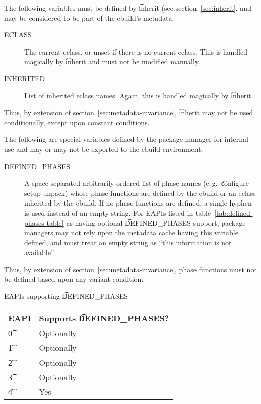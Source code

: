 The following variables must be defined by \t{inherit} (see section~\ref{sec:inherit}, and may be
considered to be part of the ebuild's metadata:

\begin{description}
\item[ECLASS] The current eclass, or unset if there is no current eclass. This is handled magically
    by \t{inherit} and must not be modified manually.
\item[INHERITED] List of inherited eclass names. Again, this is handled magically by \t{inherit}.
\end{description}

\note Thus, by extension of section~\ref{sec:metadata-invariance}, \t{inherit} may not be used
    conditionally, except upon constant conditions.

The following are special variables defined by the package manager for internal use and may or may
not be exported to the ebuild environment:

\begin{description}
\item[DEFINED\_PHASES]  A space separated arbitrarily ordered list of
phase names (e.\,g.\ \t{configure setup unpack}) whose phase functions are defined by the ebuild or
an eclass inherited by the ebuild. If no phase functions are defined, a single hyphen is used
instead of an empty string. For EAPIs listed in table~\ref{tab:defined-phases-table} as having
optional \t{DEFINED\_PHASES} support, package managers may not rely upon the metadata cache having
this variable defined, and must treat an empty string as ``this information is not available''.
\end{description}

\note Thus, by extension of section~\ref{sec:metadata-invariance}, phase functions must not be defined
based upon any variant condition.

\begin{centertable}{EAPIs supporting \t{DEFINED\_PHASES}} \label{tab:defined-phases-table}
    \begin{tabular}{ l l }
        \toprule
        \multicolumn{1}{c}{\textbf{EAPI}} &
        \multicolumn{1}{c}{\textbf{Supports \t{DEFINED\_PHASES}?}} \\
        \midrule
    \t{0} & Optionally \\
    \t{1} & Optionally \\
    \t{2} & Optionally \\
    \t{3} & Optionally \\
    \t{4} & Yes \\
    \bottomrule
    \end{tabular}
\end{centertable}


